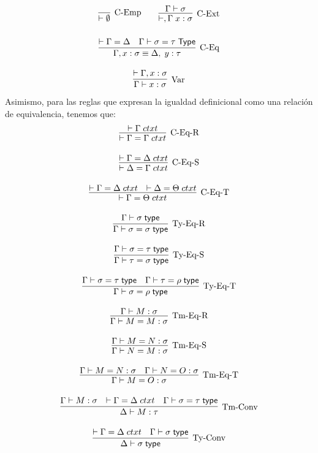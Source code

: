 \documentclass[a4paper,12pt]{report}
\theoremstyle{definition}
\theoremstyle{plain}
\theoremstyle{remark}
\begin{document}
\begin{gather}
  \infer[\text{C-Emp}]{\vdash \emptyset}{}
  \qquad
  \infer[\text{C-Ext}]{\vdash, \Gamma\;x : \sigma}{\Gamma \vdash \sigma}
  \\[2ex]
    \infer[\text{C-Eq}]
  {\Gamma, x : \sigma \equiv \Delta,\;y : \tau}
  {\vdash \Gamma = \Delta
    & \deduce[]{\Gamma \vdash \sigma = \tau \;\mathsf{Type}}{}}
  \\[2ex]
  \infer[\text{Var}]{\Gamma \vdash x : \sigma}{\vdash \Gamma, x : \sigma}
\end{gather}
Asimismo, para las reglas que expresan la igualdad definicional como una relación de equivalencia, tenemos que:
\begin{gather}
  \infer[\text{C-Eq-R}]
  {\vdash \Gamma = \Gamma\;ctxt}
  {\vdash \Gamma\;ctxt}
  \\[2ex]
  \infer[\text{C-Eq-S}]
  {\vdash \Delta = \Gamma\;ctxt}
  {\vdash \Gamma = \Delta\;ctxt}
  \\[2ex]
  \infer[\text{C-Eq-T}]
  {\vdash \Gamma = \Theta\;ctxt}
  {\vdash \Gamma = \Delta\;ctxt & \vdash \Delta = \Theta\;ctxt}
  \\[2ex]
  \infer[\text{Ty-Eq-R}]
  {\Gamma \vdash \sigma = \sigma\;\mathsf{type}}
  {\Gamma \vdash \sigma\;\mathsf{type}}
  \\[2ex]
  \infer[\text{Ty-Eq-S}]
  {\Gamma \vdash \tau = \sigma\;\mathsf{type}}
  {\Gamma \vdash \sigma = \tau\;\mathsf{type}}
  \\[2ex]
  \infer[\text{Ty-Eq-T}]
  {\Gamma \vdash \sigma = \rho\;\mathsf{type}}
  {\Gamma \vdash \sigma = \tau\;\mathsf{type} & \Gamma \vdash \tau = \rho\;\mathsf{type}}
  \\[2ex]
  \infer[\text{Tm-Eq-R}]
  {\Gamma \vdash M = M : \sigma}
  {\Gamma \vdash M : \sigma}
  \\[2ex]
  \infer[\text{Tm-Eq-S}]
  {\Gamma \vdash N = M : \sigma}
  {\Gamma \vdash M = N : \sigma}
  \\[2ex]
  \infer[\text{Tm-Eq-T}]
  {\Gamma \vdash M = O : \sigma}
  {\Gamma \vdash M = N : \sigma & \Gamma \vdash N = O : \sigma}
  \\[2ex]
  \infer[\text{Tm-Conv}]
  {\Delta \vdash M : \tau}
  {\Gamma \vdash M : \sigma & \vdash \Gamma = \Delta\;ctxt & \Gamma \vdash \sigma = \tau\;\mathsf{type}}
  \\[2ex]
  \infer[\text{Ty-Conv}]
  {\Delta \vdash \sigma\;\mathsf{type}}
  {\vdash \Gamma = \Delta\;ctxt & \Gamma \vdash \sigma\;\mathsf{type}}
\end{gather}
\newline
\end{document}
